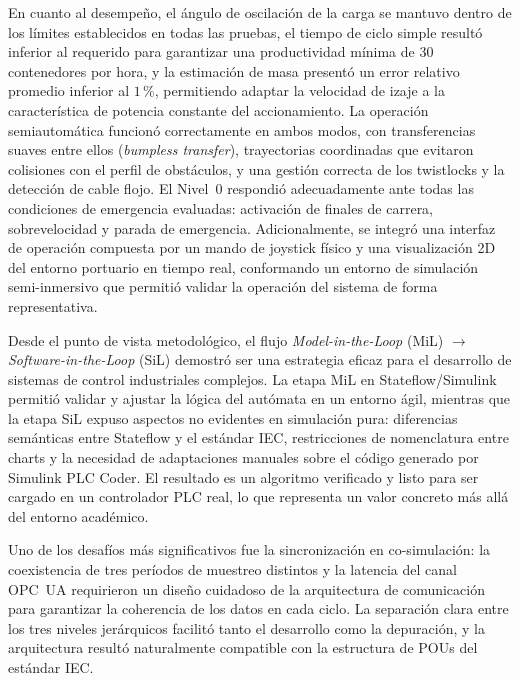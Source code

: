 \documentclass[12pt, a4paper]{article}
\begin{document}
En cuanto al desempeño, el ángulo de oscilación de la carga se mantuvo dentro de los
límites establecidos en todas las pruebas, el tiempo de ciclo simple resultó inferior
al requerido para garantizar una productividad mínima de 30 contenedores por hora, y
la estimación de masa presentó un error relativo promedio inferior al $1\,\mathrm{\%}$,
permitiendo adaptar la velocidad de izaje a la característica de potencia constante
del accionamiento. La operación semiautomática funcionó correctamente en ambos modos,
con transferencias suaves entre ellos (\textit{bumpless transfer}), trayectorias
coordinadas que evitaron colisiones con el perfil de obstáculos, y una gestión
correcta de los twistlocks y la detección de cable flojo. El Nivel~0 respondió
adecuadamente ante todas las condiciones de emergencia evaluadas: activación de
finales de carrera, sobrevelocidad y parada de emergencia. Adicionalmente, se
integró una interfaz de operación compuesta por un mando de joystick físico y una
visualización 2D del entorno portuario en tiempo real, conformando un entorno de
simulación semi-inmersivo que permitió validar la operación del sistema de forma
representativa.

Desde el punto de vista metodológico, el flujo \textit{Model-in-the-Loop} (MiL)
$\rightarrow$ \textit{Software-in-the-Loop} (SiL) demostró ser una estrategia eficaz
para el desarrollo de sistemas de control industriales complejos. La etapa MiL en
Stateflow/Simulink permitió validar y ajustar la lógica del autómata en un entorno
ágil, mientras que la etapa SiL expuso aspectos no evidentes en simulación pura:
diferencias semánticas entre Stateflow y el estándar IEC, restricciones de
nomenclatura entre charts y la necesidad de adaptaciones manuales sobre el código
generado por Simulink PLC Coder. El resultado es un algoritmo verificado y listo para
ser cargado en un controlador PLC real, lo que representa un valor concreto más allá
del entorno académico.

Uno de los desafíos más significativos fue la sincronización en co-simulación: la
coexistencia de tres períodos de muestreo distintos y la latencia del canal OPC~UA
requirieron un diseño cuidadoso de la arquitectura de comunicación para garantizar la
coherencia de los datos en cada ciclo. La separación clara entre los tres niveles
jerárquicos facilitó tanto el desarrollo como la depuración, y la arquitectura
resultó naturalmente compatible con la estructura de POUs del estándar IEC.
\end{document}
